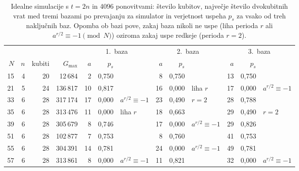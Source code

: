 \begin{table}[htbp]
\caption{Idealne simulacije s $t = 2n$ in 4096 ponovitvami: število kubitov, največje število dvokubitnih vrat med tremi bazami po prevajanju za simulator in verjetnost uspeha $p_s$ za vsako od treh naključnih baz. Opomba ob bazi pove, zakaj baza nikoli ne uspe (liha perioda $r$ ali $a^{r/2} \equiv -1 \pmod N$) oziroma zakaj uspe redkeje (perioda $r = 2$).}
\label{g29:tab:idealno}
\centering
\footnotesize
\setlength{\tabcolsep}{4pt}
\begin{tabular}{rrrr@{\hspace{1em}}rrl@{\hspace{0.5em}}rrl@{\hspace{0.5em}}rrl}
\toprule
 & & & & \multicolumn{3}{c}{1.\ baza} & \multicolumn{3}{c}{2.\ baza} & \multicolumn{3}{c}{3.\ baza} \\
\cmidrule(r){5-7} \cmidrule(r){8-10} \cmidrule{11-13}
$N$ & $n$ & kubiti & $G_{\max}$ & $a$ & $p_s$ & & $a$ & $p_s$ & & $a$ & $p_s$ & \\
\midrule
15 & 4 & 20 & 12\,684 & 2 & 0,750 &  & 8 & 0,750 &  & 13 & 0,750 &  \\
21 & 5 & 24 & 136\,817 & 10 & 0,817 &  & 16 & 0,000 & {\scriptsize liha $r$} & 17 & 0,000 & {\scriptsize $a^{r/2} \equiv -1$} \\
33 & 6 & 28 & 317\,174 & 17 & 0,000 & {\scriptsize $a^{r/2} \equiv -1$} & 23 & 0,490 & {\scriptsize $r = 2$} & 28 & 0,788 &  \\
35 & 6 & 28 & 313\,476 & 11 & 0,000 & {\scriptsize liha $r$} & 18 & 0,663 &  & 29 & 0,490 & {\scriptsize $r = 2$} \\
39 & 6 & 28 & 305\,679 & 8 & 0,746 &  & 17 & 0,000 & {\scriptsize $a^{r/2} \equiv -1$} & 29 & 0,826 &  \\
51 & 6 & 28 & 102\,877 & 7 & 0,753 &  & 8 & 0,760 &  & 41 & 0,753 &  \\
55 & 6 & 28 & 304\,391 & 14 & 0,781 &  & 24 & 0,000 & {\scriptsize $a^{r/2} \equiv -1$} & 49 & 0,781 &  \\
57 & 6 & 28 & 313\,861 & 8 & 0,000 & {\scriptsize $a^{r/2} \equiv -1$} & 11 & 0,821 &  & 32 & 0,000 & {\scriptsize $a^{r/2} \equiv -1$} \\
\bottomrule
\end{tabular}
\end{table}

